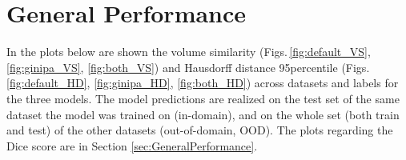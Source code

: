 \renewcommand\thefigure{A.\arabic{figure}}
\setcounter{figure}{0}
 \label{app:SupplementaryPlots}
\vspace{1cm}

\section{General Performance}
In the plots below are shown the volume similarity (Figs.\,\ref{fig:default_VS}, \ref{fig:ginipa_VS}, \ref{fig:both_VS}) and Hausdorff distance 95\th percentile (Figs.\,\ref{fig:default_HD}, \ref{fig:ginipa_HD}, \ref{fig:both_HD}) across datasets and labels for the three models. The model predictions are realized on the test set of the same dataset the model was trained on (in-domain), and on the whole set (both train and test) of the other datasets (out-of-domain, OOD). The plots regarding the Dice score are in Section \ref{sec:GeneralPerformance}.

